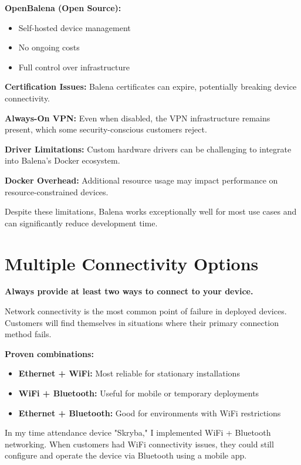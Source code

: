 \textbf{OpenBalena (Open Source):}
\begin{itemize}
\item Self-hosted device management
\item No ongoing costs
\item Full control over infrastructure
\end{itemize}

\begin{tcolorbox}[colback=red!10,colframe=red!75!black,title=Balena Gotchas]
\textbf{Certification Issues:} Balena certificates can expire, potentially breaking device connectivity.

\textbf{Always-On VPN:} Even when disabled, the VPN infrastructure remains present, which some security-conscious customers reject.

\textbf{Driver Limitations:} Custom hardware drivers can be challenging to integrate into Balena's Docker ecosystem.

\textbf{Docker Overhead:} Additional resource usage may impact performance on resource-constrained devices.
\end{tcolorbox}

Despite these limitations, Balena works exceptionally well for most use cases and can significantly reduce development time.

\section{Multiple Connectivity Options}

\textbf{Always provide at least two ways to connect to your device.}

Network connectivity is the most common point of failure in deployed devices. Customers will find themselves in situations where their primary connection method fails.

\textbf{Proven combinations:}
\begin{itemize}
\item \textbf{Ethernet + WiFi:} Most reliable for stationary installations
\item \textbf{WiFi + Bluetooth:} Useful for mobile or temporary deployments
\item \textbf{Ethernet + Bluetooth:} Good for environments with WiFi restrictions
\end{itemize}

In my time attendance device "Skryba," I implemented WiFi + Bluetooth networking. When customers had WiFi connectivity issues, they could still configure and operate the device via Bluetooth using a mobile app.

